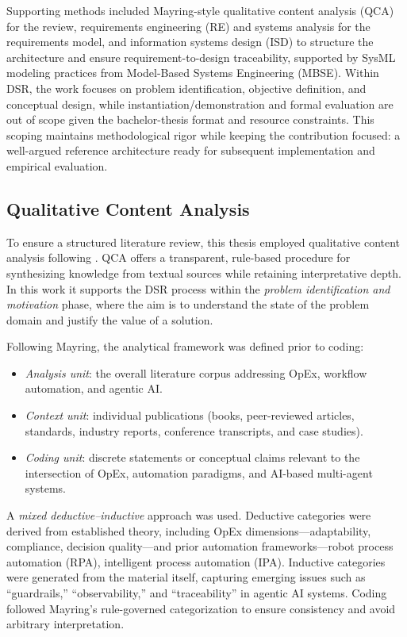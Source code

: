 Supporting methods included Mayring-style qualitative content analysis (QCA) for the review, requirements engineering (RE) and systems analysis for the requirements model, and information systems design (ISD) to structure the architecture and ensure requirement-to-design traceability, supported by SysML modeling practices from Model-Based Systems Engineering (MBSE). Within DSR, the work focuses on problem identification, objective definition, and conceptual design, while instantiation/demonstration and formal evaluation are out of scope given the bachelor-thesis format and resource constraints. This scoping maintains methodological rigor while keeping the contribution focused: a well-argued reference architecture ready for subsequent implementation and empirical evaluation.

\subsection{Qualitative Content Analysis}\label{subsec:qca}
To ensure a structured literature review, this thesis employed qualitative content analysis following \textcite{mayringQualitative2022}. 
QCA offers a transparent, rule-based procedure for synthesizing knowledge from textual sources while retaining interpretative depth. 
In this work it supports the DSR process \parencite{peffersDesign2007} within the \emph{problem identification and motivation} phase, 
where the aim is to understand the state of the problem domain and justify the value of a solution.

Following Mayring, the analytical framework was defined prior to coding:
\begin{itemize}
    \item \textit{Analysis unit}: the overall literature corpus addressing OpEx, workflow automation, and agentic AI.
    \item \textit{Context unit}: individual publications (books, peer-reviewed articles, standards, industry reports, conference transcripts, and case studies).
    \item \textit{Coding unit}: discrete statements or conceptual claims relevant to the intersection of OpEx, automation paradigms, and AI-based multi-agent systems.
\end{itemize}

A \emph{mixed deductive--inductive} approach was used. Deductive categories were derived from established theory, including OpEx dimensions---adaptability, compliance, decision quality---and prior automation frameworks---robot process automation (RPA), intelligent process automation (IPA). 
Inductive categories were generated from the material itself, capturing emerging issues such as ``guardrails,'' ``observability,'' and ``traceability'' in agentic AI systems. 
Coding followed Mayring's rule-governed categorization to ensure consistency and avoid arbitrary interpretation.

